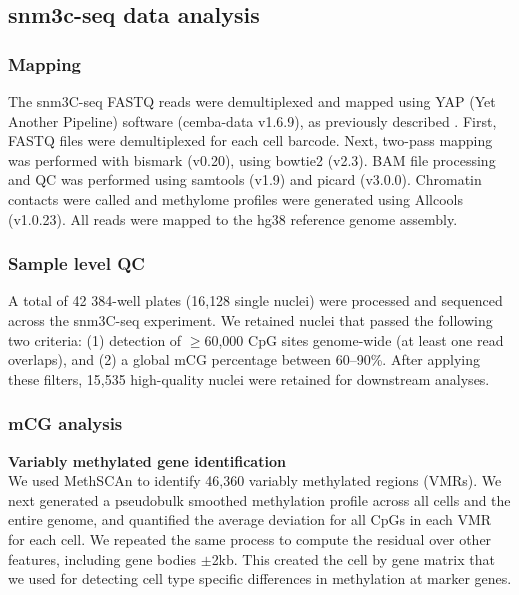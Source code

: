 \subsection{snm3c-seq data analysis}

\subsubsection{Mapping}

The snm3C-seq FASTQ reads were demultiplexed and mapped using YAP (Yet Another Pipeline) software (cemba-data v1.6.9), as previously described \cite{Liu2021-km}. First, FASTQ files were demultiplexed for each cell barcode. Next, two-pass mapping was performed with bismark  (v0.20), using bowtie2 (v2.3). BAM file processing and QC was performed using samtools  (v1.9) and picard (v3.0.0). Chromatin contacts were called and methylome profiles were generated using Allcools (v1.0.23). All reads were mapped to the hg38 reference genome assembly.

\subsubsection{Sample level QC}

A total of 42 384-well plates (16{,}128 single nuclei) were processed and sequenced across the snm3C-seq experiment. We retained nuclei that passed the following two criteria: (1) detection of $\geq$60{,}000 CpG sites genome-wide (at least one read overlaps), and (2) a global mCG percentage between 60--90\%. After applying these filters, 15{,}535 high-quality nuclei were retained for downstream analyses.

\subsubsection{mCG analysis}

\noindent
\textbf{Variably methylated gene identification} \\
We used MethSCAn \cite{Kremer2024-pd} to identify 46{,}360 variably methylated regions (VMRs). We next generated a pseudobulk smoothed methylation profile across all cells and the entire genome, and quantified the average deviation for all CpGs in each VMR for each cell. We repeated the same process to compute the residual over other features, including gene bodies $\pm$2kb. This created the cell by gene matrix that we used for detecting cell type specific differences in methylation at marker genes.

